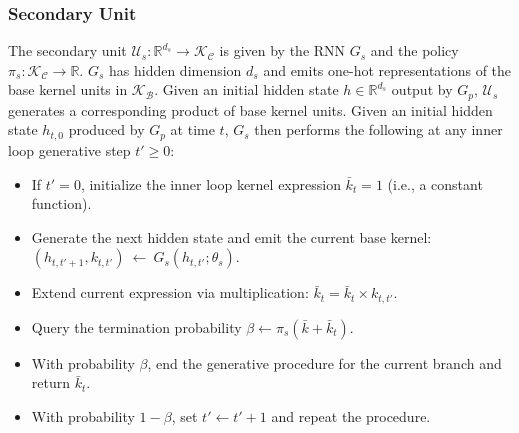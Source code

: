 \subsubsection{Secondary Unit}
The secondary unit $\mathcal{U}_s: \mathbb{R}^{d_s} \rightarrow \mathcal{K_C}$ is given by the RNN $G_s$ and the policy $\pi_s: \mathcal{K_C} \rightarrow \mathbb{R}$. $G_s$ has hidden dimension $d_s$ and emits one-hot representations of the base kernel units in $\mathcal{K_B}$. Given an initial hidden state $h \in \mathbb{R}^{d_s}$ output by $G_p$, $\mathcal{U}_s$ generates a corresponding product of base kernel units. Given an initial hidden state $h_{t,0}$ produced by $G_p$ at time $t$, $G_s$ then performs the following at any inner loop generative step $t' \geq 0$:
\begin{itemize}
    \item If $t'=0$, initialize the inner loop kernel expression $\bar{k}_t = 1$ (i.e., a constant function).
    \item Generate the next hidden state and emit the current base kernel: $(h_{t, t'+1}, k_{t, t'})~\leftarrow~G_s(h_{t, t'}; \theta_s)$.
    \item Extend current expression via multiplication: $\bar{k}_t = \bar{k}_t \times k_{t, t'}$.
    \item Query the termination probability $\beta \leftarrow \pi_s(\bar{k} + \bar{k}_t)$.
    \item With probability $\beta$, end the generative procedure for the current branch and return $\bar{k}_t$.
    \item With probability $1 - \beta$, set $t' \leftarrow t' + 1$ and repeat the procedure.
\end{itemize}

